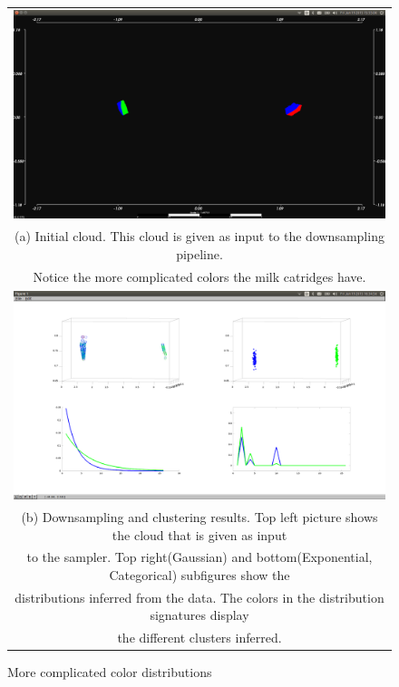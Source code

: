 \documentclass[twoside,hidelinks]{article}
\begin{document}
\begin{figure}
\begin{tabular}{c}
  \includegraphics[width=1\textwidth]{clusterings/coloursSource} \\
  (a) Initial cloud. This cloud is given as input to the downsampling pipeline.    \\
   Notice the more complicated colors the milk catridges have. \\
   \includegraphics[width=1\textwidth]{clusterings/coloursCorrect} \\
 (b) Downsampling and clustering results. Top left picture shows the cloud that is given as input\\
 to the sampler. Top right(Gaussian) and bottom(Exponential, Categorical) subfigures show the \\
 distributions inferred from the data. The colors in the distribution signatures display \\
 the different clusters inferred.\end{tabular}
\caption{More complicated color distributions}
  \label{pcl:clust2}
\end{figure}
\end{document}

